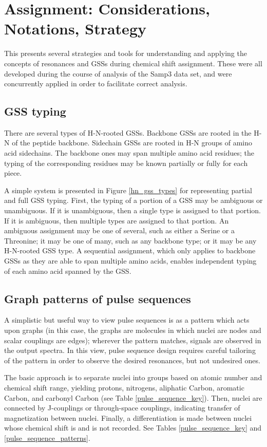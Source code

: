 \chapter{Assignment: Considerations, Notations, Strategy}
This presents several strategies and tools for understanding and applying
the concepts of resonances and GSSs during chemical shift assignment.
These were all developed during the course of analysis of the Samp3 data set,
and were concurrently applied in order to facilitate correct analysis.


\section{GSS typing}
There are several types of H-N-rooted GSSs.  Backbone GSSs are rooted in the
H-N of the peptide backbone.  Sidechain GSSs are rooted in H-N groups of
amino acid sidechains.
The backbone ones may span multiple amino acid residues; the typing of the 
corresponding residues may be known partially or fully for each piece.

A simple system is presented in Figure \ref{hn_gss_types} for representing 
partial and full GSS typing.  First, the typing of a portion of a GSS may be 
ambiguous or unambiguous.  If it is unambiguous, then a single type is assigned
to that portion.  If it is ambiguous, then multiple types are assigned to that
portion.  An ambiguous assignment may be one of several, such as either a
Serine or a Threonine; it may be one of many, such as any backbone type; or
it may be any H-N-rooted GSS type.  A sequential assignment, which only applies
to backbone GSSs as they are able to span multiple amino acids, enables 
independent typing of each amino acid spanned by the GSS.


\section{Graph patterns of pulse sequences}
A simplistic but useful way to view pulse sequences is as a pattern which
acts upon graphs (in this case, the graphs are molecules in which nuclei are
nodes and scalar couplings are edges); wherever the pattern matches, signals 
are observed in the output spectra.  In this view, pulse sequence design 
requires careful tailoring of the pattern in order to observe the desired 
resonances, but not undesired ones.

The basic approach is to separate nuclei into groups based on atomic number
and chemical shift range, yielding protons, nitrogens, aliphatic Carbon,
aromatic Carbon, and carbonyl Carbon (see Table \ref{pulse_sequence_key}).
Then, nuclei are connected by J-couplings or through-space couplings, 
indicating transfer of magnetization between nuclei.
Finally, a differentiation is made between nuclei whose chemical shift is 
and is not recorded.  See Tables \ref{pulse_sequence_key} and 
\ref{pulse_sequence_patterns}.

